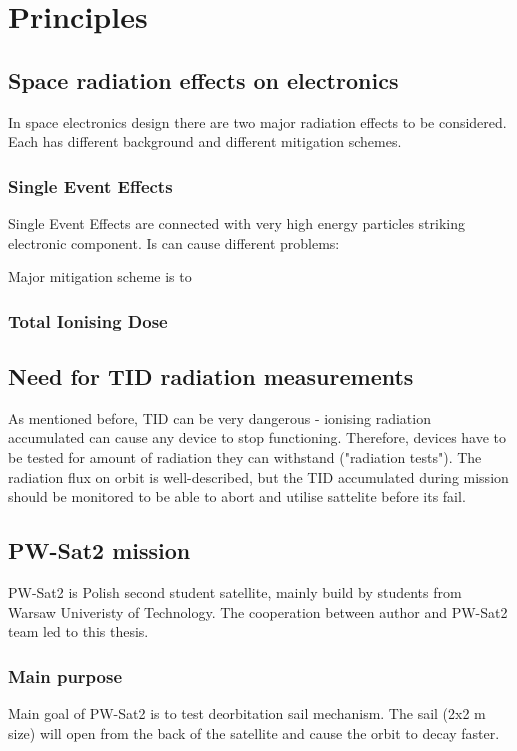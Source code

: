 \chapter{Principles}

\section{Space radiation effects on electronics}
In space electronics design there are two major radiation effects to be considered. Each has different background and different mitigation schemes.

\subsection{Single Event Effects}
Single Event Effects are connected with very high energy particles striking electronic component. Is can cause different problems:


Major mitigation scheme is to 
\subsection{Total Ionising Dose}


\section{Need for TID radiation measurements}
    As mentioned before, TID can be very dangerous - ionising radiation accumulated can cause any device to stop functioning. Therefore, devices have to be tested for amount of radiation they can withstand ("radiation tests"). The radiation flux on orbit is well-described, but the TID accumulated during mission should be monitored to be able to abort and utilise sattelite before its fail. 

\section{PW-Sat2 mission}
    PW-Sat2 is Polish second student satellite, mainly build by students from Warsaw Univeristy of Technology. The cooperation between author and PW-Sat2 team led to this thesis.

\subsection{Main purpose}
    Main goal of PW-Sat2 is to test deorbitation sail mechanism. The sail (2x2 m size) will open from the back of the satellite and cause the orbit to decay faster.

